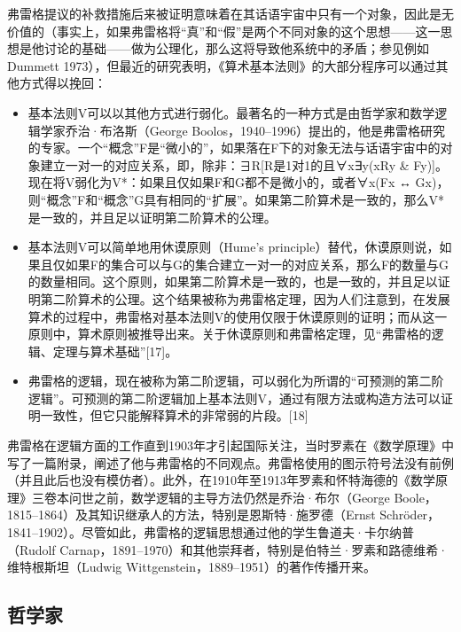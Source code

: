 弗雷格提议的补救措施后来被证明意味着在其话语宇宙中只有一个对象，因此是无价值的（事实上，如果弗雷格将“真”和“假”是两个不同对象的这个思想——这一思想是他讨论的基础——做为公理化，那么这将导致他系统中的矛盾；参见例如Dummett 1973），但最近的研究表明，《算术基本法则》的大部分程序可以通过其他方式得以挽回：
\begin{itemize}
\item 基本法则V可以以其他方式进行弱化。最著名的一种方式是由哲学家和数学逻辑学家乔治·布洛斯（George Boolos，1940–1996）提出的，他是弗雷格研究的专家。一个“概念”F是“微小的”，如果落在F下的对象无法与话语宇宙中的对象建立一对一的对应关系，即，除非：∃R[R是1对1的且∀x∃y(xRy & Fy)]。现在将V弱化为V*：如果且仅如果F和G都不是微小的，或者∀x(Fx ↔ Gx)，则“概念”F和“概念”G具有相同的“扩展”。如果第二阶算术是一致的，那么V*是一致的，并且足以证明第二阶算术的公理。
\item 基本法则V可以简单地用休谟原则（Hume's principle）替代，休谟原则说，如果且仅如果F的集合可以与G的集合建立一对一的对应关系，那么F的数量与G的数量相同。这个原则，如果第二阶算术是一致的，也是一致的，并且足以证明第二阶算术的公理。这个结果被称为弗雷格定理，因为人们注意到，在发展算术的过程中，弗雷格对基本法则V的使用仅限于休谟原则的证明；而从这一原则中，算术原则被推导出来。关于休谟原则和弗雷格定理，见“弗雷格的逻辑、定理与算术基础”[17]。
\item 弗雷格的逻辑，现在被称为第二阶逻辑，可以弱化为所谓的“可预测的第二阶逻辑”。可预测的第二阶逻辑加上基本法则V，通过有限方法或构造方法可以证明一致性，但它只能解释算术的非常弱的片段。[18]
\end{itemize}
弗雷格在逻辑方面的工作直到1903年才引起国际关注，当时罗素在《数学原理》中写了一篇附录，阐述了他与弗雷格的不同观点。弗雷格使用的图示符号法没有前例（并且此后也没有模仿者）。此外，在1910年至1913年罗素和怀特海德的《数学原理》三卷本问世之前，数学逻辑的主导方法仍然是乔治·布尔（George Boole，1815–1864）及其知识继承人的方法，特别是恩斯特·施罗德（Ernst Schröder，1841–1902）。尽管如此，弗雷格的逻辑思想通过他的学生鲁道夫·卡尔纳普（Rudolf Carnap，1891–1970）和其他崇拜者，特别是伯特兰·罗素和路德维希·维特根斯坦（Ludwig Wittgenstein，1889–1951）的著作传播开来。
\subsection{哲学家}

